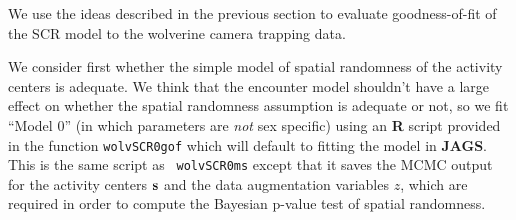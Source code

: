 We use the ideas described in the previous section to evaluate
goodness-of-fit of the SCR model to the wolverine camera trapping data.


We consider first whether the simple model of spatial randomness of
the activity centers is adequate.  We think that the
 encounter model shouldn't have a large  effect on
whether the spatial randomness assumption is adequate or not, so we
fit ``Model 0'' (in which parameters are {\it not} sex specific)
using an {\bf R} script provided
in the function \mbox{\tt wolvSCR0gof} which will default to fitting
the model in {\bf JAGS}.  This is the same script as \mbox{\tt
  wolvSCR0ms} except that it saves the MCMC output for the activity
centers ${\bf s}$ and the data augmentation variables $z$, which are
required in order to compute the Bayesian p-value test of spatial randomness.


